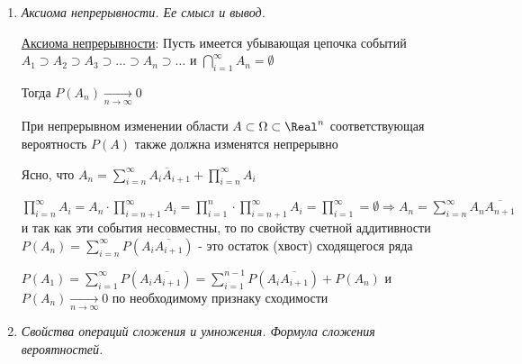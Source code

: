 \documentclass[12pt]{article}
\begin{document}
\begin{enumerate}
    \hyperlink{probabilityspace}{Вероятностное пространство}: Вероятностное пространство - тройка $(\Omega, \mathcal{F}, P)$

    \hyperlink{probabilityproperties}{Свойства вероятности}: 

    \begin{enumerate}
        \item Так как $\emptyset$ и $\Omega$ - несовместные, то $1 = P(\Omega) = P(\Omega + \emptyset) = 1 + P(\emptyset) \Longrightarrow P(\emptyset) = 0$

        \item Формула обратной вероятности: $P(A) = 1 - P(\overline{A})$

        \item $P(A) = 1 - P(\overline{A}) \leq 1$
    \end{enumerate}

    \item \textit{Аксиома непрерывности. Ее смысл и вывод.}

    \hyperlink{continuityaxiom}{Аксиома непрерывности}: \Ths Пусть имеется убывающая цепочка событий $A_1 \supset A_2 \supset A_3 \supset \dots \supset A_n \supset \dots$ и $\bigcap_{i = 1}^\infty A_n = \emptyset$

    Тогда $P(A_n) \underset{n \to \infty}{\to} 0$

    При непрерывном изменении области $A \subset \Omega \subset \Real^n$ соответствующая вероятность $P(A)$ также должна изменятся непрерывно

    \begin{MyProof}
        Ясно, что $A_n = \sum_{i = n}^\infty A_i \overline{A}_{i + 1} + \prod_{i = n}^\infty A_i$

        $\prod_{i = n}^\infty A_i = A_n \cdot \prod_{i = n + 1}^\infty A_i = \prod_{i = 1}^n
        \cdot \prod_{i = n + 1}^\infty A_i = \prod_{i = 1}^\infty = \emptyset \Longrightarrow
        A_n = \sum_{i = n}^\infty A_n \overline{A_{n + 1}}$ и так как эти события несовместны,
        то по свойству счетной аддитивности $P(A_n) = \sum_{i = n}^\infty P(A_i \overline{A_{i + 1}})$ - это остаток (хвост) сходящегося ряда

        $P(A_1) = \sum_{i = 1}^\infty P(A_i \overline{A_{i + 1}}) = \sum_{i = 1}^{n - 1} P(A_i \overline{A_{i + 1}}) + P(A_n)$ и $P(A_n) \underset{n \to \infty}{\to} 0$ по необходимому признаку сходимости
    \end{MyProof}

    \item \textit{Свойства операций сложения и умножения. Формула сложения вероятностей.}


\end{enumerate}
\end{document}
